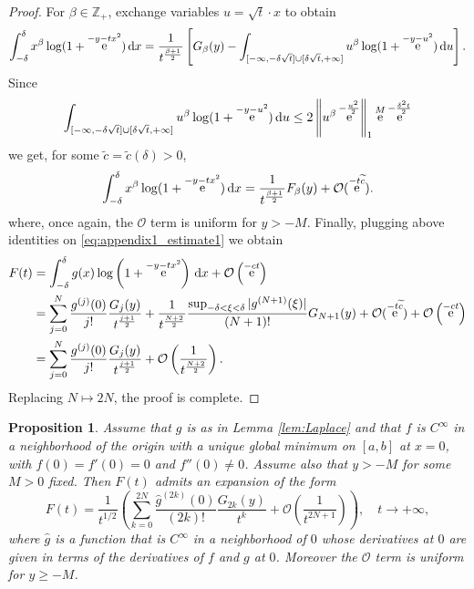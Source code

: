 \documentclass[reqno,a4paper,11pt]{amsart}
\DeclareMathOperator{\ee}{\rm e}
\newcommand{\Z}{\mathbb{Z}}
\newcommand{\Boh}{\mathcal{O}}
\newcommand{\dd}{\mathrm{d}}
\newtheorem{prop}[theorem]{Proposition}
\theoremstyle{definition}
\theoremstyle{remark}
\numberwithin{equation}{section}
\begin{document}
\begin{proof}
    For $\beta \in \Z_+$, exchange variables $u = \sqrt{t} \cdot x$ to obtain
    \[
        \int_{- \delta}^\delta x^\beta \log (1 + \ee^{- y - t x^2}) \, \dd x = \frac{1}{t^{\frac{\beta + 1}{2}}} \left[ G_\beta(y)  - 
        \int_{[-\infty, - \delta \sqrt{ t} ] \cup [\delta \sqrt{ t}, +\infty]} u^\beta \log ( 1 + \ee^{ - y - u^2}) \, \dd u \right].
    \]
    Since
    \[
        \int_{[-\infty, - \delta \sqrt{ t} ] \cup [\delta \sqrt{ t}, +\infty]} u^\beta \log ( 1 + \ee^{ - y - u^2}) \, \dd u 
        \leq 2 \left\| u^\beta \ee^{- \frac{u^2}{2}} \right\|_1 \ee^M \ee^{- \frac{\delta^2 t}{2}}
    \]
    we get, for some $\widetilde{c} = \widetilde{c}(\delta) > 0$,
    \[
        \int_{- \delta}^\delta x^\beta \log (1 + \ee^{- y - t x^2}) \, \dd x = \frac{1}{t^{\frac{\beta + 1}{2}}} F_\beta(y) + \Boh(\ee^{- t \widetilde{c}}).
    \]
    where, once again, the $\Boh$ term is uniform for $y > -M$. Finally, plugging above identities on \eqref{eq:appendix1_estimate1} we obtain
    \[
        \begin{split}
            F(t) 
                &= \int_{-\delta}^\delta g(x) \log\left(1 + \ee^{- y - t x^2} \right) \, \dd x +  \Boh \left( \ee^{- c t}\right) \\
                &= \sum_{j=0}^N \frac{g^{(j)}(0)}{j!}\frac{G_j(y)}{t^{\frac{j+1}{2}}}
                + \frac{1}{t^{\frac{N+2}{2}}} \frac{\sup_{-\delta < \xi < \delta}|g^{(N+1)}(\xi)|}{(N+1)!} G_{N+1}(y)
                + \Boh(\ee^{-t \widetilde{c}}) + \Boh \left( \ee^{- c t}\right) \\
                &= \sum_{j=0}^N \frac{g^{(j)}(0)}{j!} \frac{G_j(y)}{t^{\frac{j+1}{2}}}  + \Boh \left( \frac{1}{t^{\frac{N+2}{2}}} \right) .
        \end{split}
    \]
    Replacing $N\mapsto 2N$, the proof is complete.
\end{proof}

\begin{prop}\label{prop:Laplace}
    Assume that $g$ is as in Lemma \ref{lem:Laplace} and that $f$ is $C^\infty$ in a neighborhood of the origin with a unique global minimum on $[a,b]$ at $x =0$, with $f(0) = f'(0) = 0$ and $f''(0) \neq 0$. Assume also that $ y > -M$ for some $M > 0$ fixed. Then $F(t)$ admits an expansion of the form
    \[
        F(t) =\frac{1}{t^{1/2}} \left(\sum_{k=0}^{2N} \frac{\widehat{g}^{(2k)}(0)}{(2k)!} \frac{G_{2k}(y)}{t^{k}} + \Boh \left( \frac{1}{t^{2N+1}}\right)\right), \quad t \to +\infty,
    \]
    where $\widehat g$ is a function that is $C^\infty$ in a neighborhood of $0$ whose derivatives at $0$ are given in terms of the derivatives of $f$ and $g$ at $0$. Moreover the $\Boh$ term is uniform for $y \geq -M$.
\end{prop}
\end{document}
